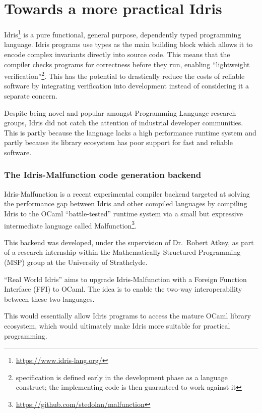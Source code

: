 \section{Towards a more practical Idris}

Idris\footnote{\url{https://www.idris-lang.org/}} is a pure functional,
general purpose, dependently typed programming language.
Idris programs use types as the main building block which allows it
to encode complex invariants directly into source code.
This means that the compiler checks programs for
correctness before they run, enabling
``lightweight verification''\footnote{specification is
	defined early in the development phase as a language construct;
	the implementing code is then guaranteed to work against it}.
This has the potential to drastically reduce the costs
of reliable software by integrating verification into development
instead of considering it a separate concern.

Despite being novel and popular amongst Programming Language research
groups, Idris did not catch the attention of industrial developer
communities.
This is partly because the language lacks a high performance
runtime system and partly because its library ecosystem has poor
support for fast and reliable software.

\subsubsection{The Idris-Malfunction code generation backend}

Idris-Malfunction is a recent experimental compiler backend targeted at
solving the performance gap between Idris and other compiled languages
by compiling Idris to the OCaml ``battle-tested'' runtime system
via a small but expressive intermediate language
called
Malfunction\footnote{\url{https://github.com/stedolan/malfunction}}.

This backend was developed, under the supervision of
Dr.~Robert Atkey, as part of a research internship
within the Mathematically Structured Programming (MSP) group at the
University of Strathclyde.

``Real World Idris'' aims to upgrade Idris-Malfunction
with a Foreign Function Interface (FFI) to OCaml.
The idea is to enable the two-way interoperability between these two
languages.

This would essentially allow Idris programs to access the mature OCaml
library ecosystem, which would ultimately make Idris more suitable
for practical programming.


